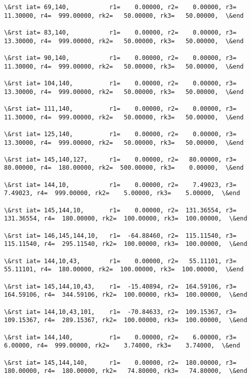 \documentclass[11pt]{article}
\begin{document}
\begin{Verbatim}[commandchars=\\\{\}]
\&rst iat= 69,140,           r1=    0.00000, r2=    0.00000, r3=   11.30000, r4=  999.00000, rk2=   50.00000, rk3=   50.00000,  \&end

\&rst iat= 83,140,           r1=    0.00000, r2=    0.00000, r3=   13.30000, r4=  999.00000, rk2=   50.00000, rk3=   50.00000,  \&end

\&rst iat= 90,140,           r1=    0.00000, r2=    0.00000, r3=   11.30000, r4=  999.00000, rk2=   50.00000, rk3=   50.00000,  \&end

\&rst iat= 104,140,          r1=    0.00000, r2=    0.00000, r3=   13.30000, r4=  999.00000, rk2=   50.00000, rk3=   50.00000,  \&end

\&rst iat= 111,140,          r1=    0.00000, r2=    0.00000, r3=   11.30000, r4=  999.00000, rk2=   50.00000, rk3=   50.00000,  \&end

\&rst iat= 125,140,          r1=    0.00000, r2=    0.00000, r3=   13.30000, r4=  999.00000, rk2=   50.00000, rk3=   50.00000,  \&end

\&rst iat= 145,140,127,      r1=    0.00000, r2=   80.00000, r3=   80.00000, r4=  180.00000, rk2=  500.00000, rk3=    0.00000,  \&end

\&rst iat= 144,10,           r1=    0.00000, r2=    7.49023, r3=    7.49023, r4=  999.00000, rk2=    5.00000, rk3=    5.00000,  \&end

\&rst iat= 145,144,10,       r1=    0.00000, r2=  131.36554, r3=  131.36554, r4=  180.00000, rk2=  100.00000, rk3=  100.00000,  \&end

\&rst iat= 146,145,144,10,   r1=  -64.88460, r2=  115.11540, r3=  115.11540, r4=  295.11540, rk2=  100.00000, rk3=  100.00000,  \&end

\&rst iat= 144,10,43,        r1=    0.00000, r2=   55.11101, r3=   55.11101, r4=  180.00000, rk2=  100.00000, rk3=  100.00000,  \&end

\&rst iat= 145,144,10,43,    r1=  -15.40894, r2=  164.59106, r3=  164.59106, r4=  344.59106, rk2=  100.00000, rk3=  100.00000,  \&end

\&rst iat= 144,10,43,101,    r1=  -70.84633, r2=  109.15367, r3=  109.15367, r4=  289.15367, rk2=  100.00000, rk3=  100.00000,  \&end

\&rst iat= 144,140,          r1=    0.00000, r2=    6.00000, r3=    6.00000, r4=  999.00000, rk2=    3.74000, rk3=    3.74000,  \&end

\&rst iat= 145,144,140,      r1=    0.00000, r2=  180.00000, r3=  180.00000, r4=  180.00000, rk2=   74.80000, rk3=   74.80000,  \&end


\end{Verbatim}
\end{document}
